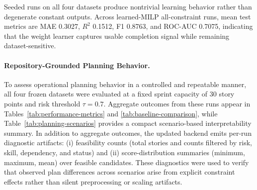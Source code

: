 \documentclass[conference]{IEEEtran}
\begin{document}
Seeded runs on all four datasets produce nontrivial learning behavior rather than
degenerate constant outputs. Across learned-MILP all-constraint runs, mean test
metrics are MAE 0.3027, $R^2$ 0.1512, F1 0.8763, and ROC-AUC 0.7075, indicating that
the weight learner captures usable completion signal while remaining dataset-sensitive.

\paragraph{Repository-Grounded Planning Behavior.}

To assess operational planning behavior in a controlled and repeatable manner,
all four frozen datasets were evaluated at a fixed sprint capacity of 30 story points
and risk threshold $\tau=0.7$.
Aggregate outcomes from these runs appear in
Tables~\ref{tab:performance-metrics} and \ref{tab:baseline-comparison}, while
Table~\ref{tab:planning-scenarios} provides a compact scenario-based interpretability
summary.
In addition to aggregate outcomes, the updated backend emits per-run diagnostic
artifacts: (i) feasibility counts (total stories and counts filtered by risk,
skill, dependency, and status) and (ii) score-distribution summaries
(minimum, maximum, mean) over feasible candidates. These diagnostics were used to
verify that observed plan differences across scenarios arise from explicit
constraint effects rather than silent preprocessing or scaling artifacts.
\end{document}
